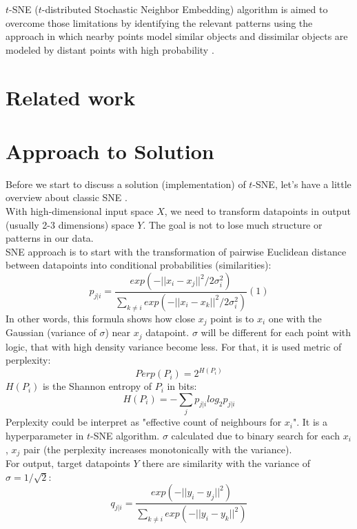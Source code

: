 $t$-SNE ($t$-distributed Stochastic Neighbor Embedding) algorithm is aimed to overcome those limitations by identifying the relevant patterns using the approach in which nearby points model similar objects and dissimilar objects are modeled by distant points with high probability \cite{tsnearticle}. 

\section{Related work}

\section{Approach to Solution}

Before we start to discuss a solution (implementation) of $t$-SNE, let's have a little overview about classic SNE \cite{snearticle}.\\
With high-dimensional input space $X$, we need to transform datapoints in output (usually 2-3 dimensions) space $Y$. The goal is not to lose much structure or patterns in our data.\\
SNE approach is to start with the transformation of pairwise Euclidean distance between datapoints into conditional probabilities (similarities):
\begin{equation}
    p_{j|i} = \frac{exp(-||x_i - x_j||^2 / 2 \sigma_i^2)}{\sum_{k \ne i}{exp(-||x_i - x_k||^2 / 2 \sigma_i^2)}} (1)
\end{equation}
In other words, this formula shows how close $x_j$ point is to $x_i$ one with the Gaussian (variance of $\sigma$) near $x_j$ datapoint. $\sigma$ will be different for each point with logic, that with high density variance become less. For that, it is used metric of perplexity:
$$ Perp(P_i) = 2^{H(P_i)} $$
$H(P_i)$ is the Shannon entropy of $P_i$ in bits:
\begin{equation}
    H(P_i) = -\sum_j{}p_{j|i} log_2{p_{j|i}}
\end{equation}
Perplexity could be interpret as "effective count of neighbours for $x_i$". It is a hyperparameter in $t$-SNE algorithm. $\sigma$ calculated due to binary search for each $x_i$, $x_j$ pair (the perplexity increases monotonically with the variance).\\
For output, target datapoints $Y$ there are similarity with the variance of $\sigma = 1/\sqrt{2}$:
$$ q_{j|i} = \frac{exp(-||y_i - y_j||^2)}{\sum_{k \ne i}{exp(-||y_i - y_k||^2)}} $$

